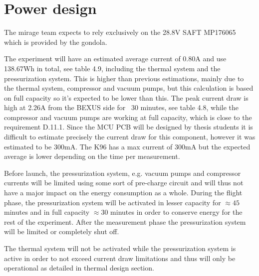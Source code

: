 \documentclass[
  a4paper,
  11pt,
  openany,
  parskip,
  toc=totoc,
  listof=totoc,
  bibliography=totoc
]{scrreprt}
\begin{document}
\section{Power design}

The \gls{mirage} team expects to rely exclusively on the 28.8V SAFT MP176065 which is provided by the gondola.

The experiment will have an estimated average current of 0.80A and use 138.67Wh in total, see table 4.9, including the thermal system and the pressurization system. This is higher than previous estimations, mainly due to the thermal system, compressor and vacuum pumps, but this calculation is based on full capacity so it's expected to be lower than this. The peak current draw is high at 2.26A from the BEXUS side for ~30 minutes, see table 4.8, while the compressor and vacuum pumps are working at full capacity, which is close to the requirement D.11.1. 
Since the MCU PCB will be designed by thesis students it is difficult to estimate precisely the current draw for this component, however it was estimated to be 300mA. The K96 has a max current of 300mA but the expected average is lower depending on the time per measurement. 

Before launch, the pressurization system, e.g. vacuum pumps and compressor currents will be limited using some sort of pre-charge circuit and will thus not have a major impact on the energy consumption as a whole. During the flight phase, the pressurization system will be activated in lesser capacity for $\approx 45$ minutes and in full capacity $\approx 30$ minutes in order to conserve energy for the rest of the experiment. After the measurement phase the pressurization system will be limited or completely shut off.

The thermal system will not be activated while the pressurization system is active in order to not exceed current draw limitations and thus will only be operational as detailed in thermal design section.
\end{document}
